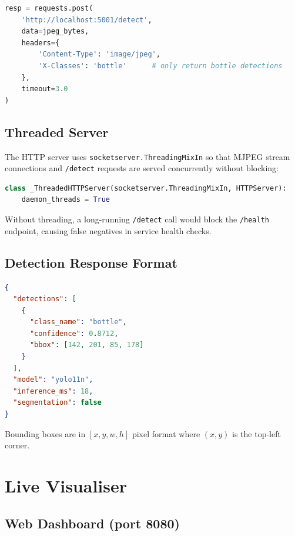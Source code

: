 \begin{lstlisting}[language=Python, caption={Class-filtered detection request.}]
resp = requests.post(
    'http://localhost:5001/detect',
    data=jpeg_bytes,
    headers={
        'Content-Type': 'image/jpeg',
        'X-Classes': 'bottle'      # only return bottle detections
    },
    timeout=3.0
)
\end{lstlisting}

\subsection{Threaded Server}

The HTTP server uses \texttt{socketserver.ThreadingMixIn} so that MJPEG stream
connections and \texttt{/detect} requests are served concurrently without blocking:

\begin{lstlisting}[language=Python, caption={Threaded HTTP server.}]
class _ThreadedHTTPServer(socketserver.ThreadingMixIn, HTTPServer):
    daemon_threads = True
\end{lstlisting}

Without threading, a long-running \texttt{/detect} call would block the
\texttt{/health} endpoint, causing false negatives in service health checks.

\subsection{Detection Response Format}

\begin{lstlisting}[language=JSON, caption={YOLO service JSON response.}]
{
  "detections": [
    {
      "class_name": "bottle",
      "confidence": 0.8712,
      "bbox": [142, 201, 85, 178]
    }
  ],
  "model": "yolo11n",
  "inference_ms": 18,
  "segmentation": false
}
\end{lstlisting}

Bounding boxes are in $[x, y, w, h]$ pixel format where $(x,y)$ is the top-left corner.

\section{Live Visualiser}

\subsection{Web Dashboard (port 8080)}

